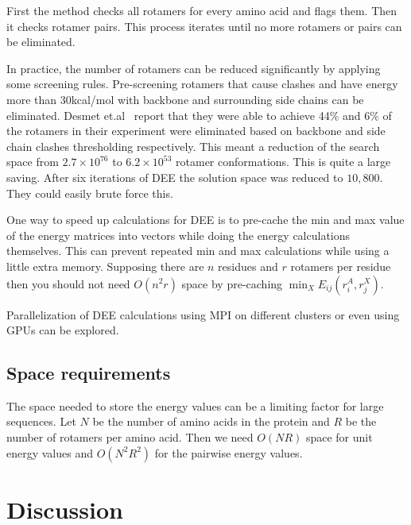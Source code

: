 \documentclass{article}
\begin{document}
First the method checks all rotamers for every amino acid and flags them. Then it checks rotamer pairs. This process iterates until no more rotamers or pairs can be eliminated. 

In practice, the number of rotamers can be reduced significantly by applying some screening rules. Pre-screening rotamers that cause clashes and have energy more than 30kcal/mol with backbone and surrounding side chains can be eliminated. Desmet et.al~\cite{Desmet1992} report  that they were able to achieve 44\% and 6\% of the rotamers in their experiment were eliminated based on backbone and side chain clashes thresholding respectively. This meant a reduction of the search space from $2.7\times10^{76}$ to $6.2\times10^{53}$ rotamer conformations. This is quite a large saving. After six iterations of DEE the solution space was reduced to $10,800$. They could easily brute force this. 

One way to speed up calculations for DEE is to pre-cache the min and max value of the energy matrices into vectors while doing the energy calculations themselves. This can prevent repeated min and max calculations while using a little extra memory. Supposing there are $n$ residues and $r$ rotamers per residue then you should not need $O(n^2r)$ space by pre-caching $\min_X E_{ij}(r_i^A,r_j^X)$.

Parallelization of DEE calculations using MPI on different clusters or even using GPUs can be explored. 

\subsection{Space requirements}
The space needed to store the energy values can be a limiting factor for large sequences. Let $N$ be the number of amino acids in the protein and $R$ be the number of rotamers per amino acid. Then we need $O(NR)$ space for unit energy values and $O(N^2R^2)$ for the pairwise energy values. 

\section{Discussion}
\end{document}
